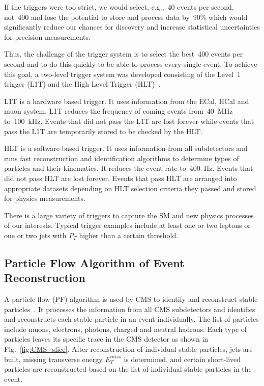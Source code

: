 If the triggers were too strict, we would select, e.g.,~40 events per second, not~400 and lose the potential to store and process data by~90\% which would significantly reduce our chances for discovery and increase statistical uncertainties for precision measurements.

Thus, the challenge of the trigger system is to select the best~400 events per second and to do this quickly to be able to process every single event. To achieve this goal, a two-level trigger system was developed consisting of the Level~1 trigger (L1T) and the High Level Trigger (HLT)~\cite{ref_TriggerSystem}.

L1T is a hardware based trigger. It uses information from the ECal, HCal and muon system. L1T reduces the frequency of coming events from~40~MHz to~100~kHz. Events that did not pass the L1T are lost forever while events that pass the L1T are temporarily stored to be checked by the HLT.

HLT is a software-based trigger. It uses information from all subdetectors and runs fast reconstruction and identification algorithms to determine types of particles and their kinematics. It reduces the event rate to~400~Hz. Events that did not pass HLT are lost forever. Events that pass HLT are arranged into appropriate datasets depending on HLT selection criteria they passed and stored for physics measurements.

There is a large variety of triggers to capture the SM and new physics processes of our interests.  Typical trigger examples include at least one or two leptons or one or two jets with $P_T$ higher than a certain threshold. 


\subsection{Particle Flow Algorithm of Event Reconstruction}

A particle flow (PF) algorithm is used by CMS to identify and reconstruct stable particles~\cite{ref_ParticleFlowAlg}. It processes the information from all CMS subdetectors and identifies and reconstructs each stable particle in an event individually. The list of particles include muons, electrons, photons, charged and neutral hadrons. Each type of particles leaves its specific trace in the CMS detector as shown in Fig.~\ref{fig:CMS_slice}. After reconstruction of individual stable particles, jets are built, missing transverse energy $E_T^{miss}$ is determined, and certain short-lived particles are reconstructed based on the list of individual stable particles in the event.

